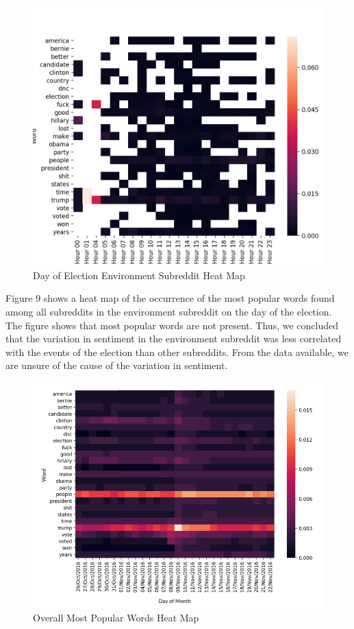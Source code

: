 \documentclass[letterpaper]{article}
\begin{document}
\begin{figure}[!htb]
\begin{center}
\includegraphics[scale=0.4]{Images/day-of-election-environment.png}
\caption{Day of Election Environment Subreddit Heat Map}
\label{fig1}
\end{center}
\end{figure}

Figure $9$ shows a heat map of the occurrence of the most popular words found among all subreddits in the environment subreddit on the day of the election. The figure shows that most popular words are not present. Thus, we concluded that the variation in sentiment in the environment subreddit was less correlated with the events of the election than other subreddits. From the data available, we are unsure of the cause of the variation in sentiment.

\begin{figure}[!htb]
\begin{center}
\includegraphics[scale=0.3]{Images/full-month-heatmap.png}
\caption{Overall Most Popular Words Heat Map}
\label{fig1}
\end{center}
\end{figure}
\end{document}
